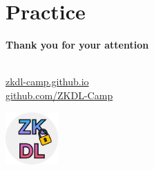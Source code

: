 \documentclass{zkdl-presentation-template}
\begin{document}
    \section{Practice}

    \begin{frame}
        \centering
        \LARGE
        \textbf{Thank you for your attention} \\

        \vspace{0.2cm} \Huge {} \large \\

        \vspace{1cm}

        \href{https://zkdl-camp.github.io/}{\hspace{.325em}zkdl-camp.github.io} \\

        \href{https://github.com/ZKDL-Camp}{\hspace{.325em}github.com/ZKDL-Camp}

        \begin{center}
            \includegraphics[width=0.15\textwidth]{images/logo.png}
        \end{center}
    \end{frame}
\end{document}
